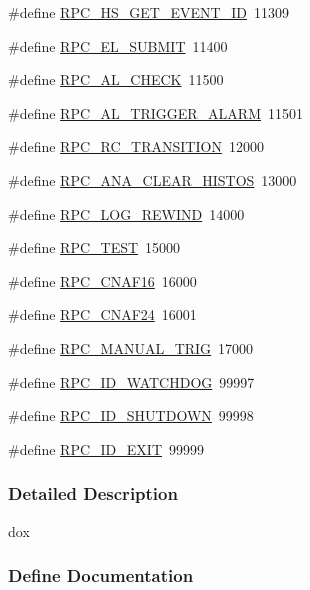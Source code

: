 \begin{DoxyCompactItemize}
\item 
\#define \hyperlink{group__mrpcdefineh_ga4f8ad9ec49e28393516bd2c909463c6c}{RPC\_\-HS\_\-GET\_\-EVENT\_\-ID}~11309
\item 
\#define \hyperlink{group__mrpcdefineh_ga01e8cb480d2e147d0df7075f7c16fd43}{RPC\_\-EL\_\-SUBMIT}~11400
\item 
\#define \hyperlink{group__mrpcdefineh_gaf06b2b267be4f2a46a0e5d6ba5c9be55}{RPC\_\-AL\_\-CHECK}~11500
\item 
\#define \hyperlink{group__mrpcdefineh_ga7010d8066162ac5b7dc3491ff46f45e0}{RPC\_\-AL\_\-TRIGGER\_\-ALARM}~11501
\item 
\#define \hyperlink{group__mrpcdefineh_ga48951274da337133b5244b6e2814e5b8}{RPC\_\-RC\_\-TRANSITION}~12000
\item 
\#define \hyperlink{group__mrpcdefineh_gab04cd68bb2484fcbaa62d2eda3100250}{RPC\_\-ANA\_\-CLEAR\_\-HISTOS}~13000
\item 
\#define \hyperlink{group__mrpcdefineh_gaaeb6f7b0868c6c7cf033e4da7c3ebf2d}{RPC\_\-LOG\_\-REWIND}~14000
\item 
\#define \hyperlink{group__mrpcdefineh_gafa20e13515da863309de89b69c843ad3}{RPC\_\-TEST}~15000
\item 
\#define \hyperlink{group__mrpcdefineh_ga04139d1c129e9a87093587d16d8ac5a4}{RPC\_\-CNAF16}~16000
\item 
\#define \hyperlink{group__mrpcdefineh_gaf48c6e230ebd543627002769684a3240}{RPC\_\-CNAF24}~16001
\item 
\#define \hyperlink{group__mrpcdefineh_gaf820c7d84c71a1469983d23ebec18a8f}{RPC\_\-MANUAL\_\-TRIG}~17000
\item 
\#define \hyperlink{group__mrpcdefineh_ga3871ac0ea0fbdba943cb70c7cfad6780}{RPC\_\-ID\_\-WATCHDOG}~99997
\item 
\#define \hyperlink{group__mrpcdefineh_ga758695700ff26f404eec79ecbeab4947}{RPC\_\-ID\_\-SHUTDOWN}~99998
\item 
\#define \hyperlink{group__mrpcdefineh_ga4fecef60778fda08ca026eaad345eca2}{RPC\_\-ID\_\-EXIT}~99999
\end{DoxyCompactItemize}


\subsubsection{Detailed Description}
dox 

\subsubsection{Define Documentation}

